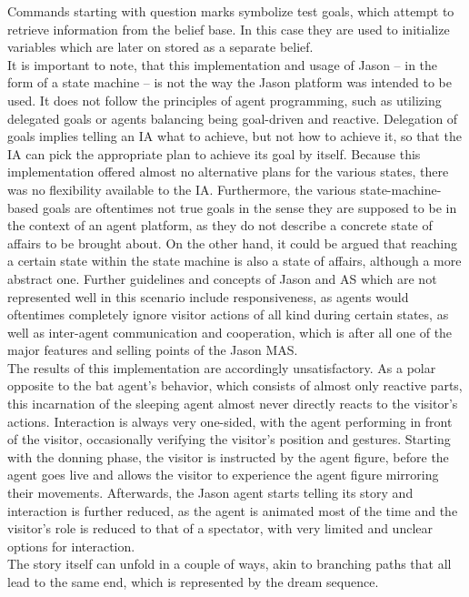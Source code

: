 \documentclass[draft,final]{vutinfth} %
\begin{document}
Commands starting with question marks symbolize test goals, which attempt to retrieve information from the belief base. 
In this case they are used to initialize variables which are later on stored as a separate belief. \\
It is important to note, that this implementation and usage of Jason – in the form of a state machine – is not the way the Jason platform was intended to be used. 
It does not follow the principles of agent programming, such as utilizing delegated goals or agents balancing being goal-driven and reactive. 
Delegation of goals implies telling an IA what to achieve, but not how to achieve it, so that the IA can pick the appropriate plan to achieve its goal by itself. 
Because this implementation offered almost no alternative plans for the various states, there was no flexibility available to the IA. 
Furthermore, the various state-machine-based goals are oftentimes not true goals in the sense they are supposed to be in the context of an agent platform, as they do not describe a concrete state of affairs to be brought about. 
On the other hand, it could be argued that reaching a certain state within the state machine is also a state of affairs, although a more abstract one. 
Further guidelines and concepts of Jason and AS which are not represented well in this scenario include responsiveness, as agents would oftentimes completely ignore visitor actions of all kind during certain states, as well as inter-agent communication and cooperation, which is after all one of the major features and selling points of the Jason MAS. \\
The results of this implementation are accordingly unsatisfactory. 
As a polar opposite to the bat agent’s behavior, which consists of almost only reactive parts, this incarnation of the sleeping agent almost never directly reacts to the visitor’s actions. 
Interaction is always very one-sided, with the agent performing in front of the visitor, occasionally verifying the visitor’s position and gestures. 
Starting with the donning phase, the visitor is instructed by the agent figure, before the agent goes live and allows the visitor to experience the agent figure mirroring their movements. 
Afterwards, the Jason agent starts telling its story and interaction is further reduced, as the agent is animated most of the time and the visitor’s role is reduced to that of a spectator, with very limited and unclear options for interaction. \\
The story itself can unfold in a couple of ways, akin to branching paths that all lead to the same end, which is represented by the dream sequence. 
\end{document}
